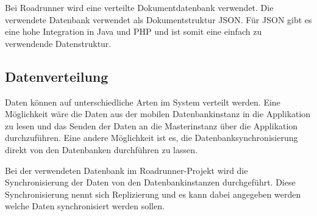 Bei Roadrunner wird eine verteilte Dokumentdatenbank verwendet. Die verwendete Datenbank verwendet als Dokumentstruktur JSON. Für JSON gibt es eine hohe Integration in Java und PHP und ist somit eine einfach zu verwendende Datenstruktur.

\subsection{Datenverteilung}

Daten können auf unterschiedliche Arten im System verteilt werden. Eine Möglichkeit wäre die Daten aus der mobilen Datenbankinstanz in die Applikation zu lesen und das Senden der Daten an die Masterinstanz über die Applikation durchzuführen. Eine andere Möglichkeit ist es, die Datenbanksynchronisierung direkt von den Datenbanken durchführen zu lassen. 

Bei der verwendeten Datenbank im Roadrunner-Projekt wird die Synchronisierung der Daten von den Datenbankinstanzen durchgeführt. Diese Synchronisierung nennt sich Replizierung und es kann dabei angegeben werden welche Daten synchronisiert werden sollen.